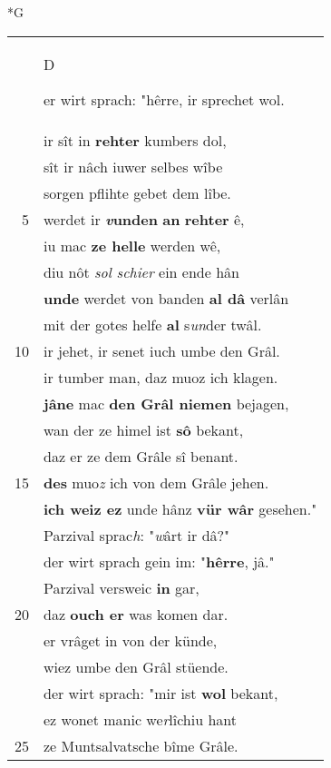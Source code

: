 \documentclass[8pt,a4paper,notitlepage]{article}
\begin{document}
\newpage
\begin{table}[ht]
\begin{minipage}[t]{0.5\linewidth}
\small
\begin{center}*G
\end{center}
\begin{tabular}{rl}
 & \begin{large}D\end{large}er wirt sprach: "hêrre, ir sprechet wol.\\ 
 & ir sît in \textbf{rehter} kumbers dol,\\ 
 & sît ir nâch iuwer selbes wîbe\\ 
 & sorgen pflihte gebet dem lîbe.\\ 
5 & werdet ir \textbf{\textit{v}unden} \textbf{an} \textbf{rehter} ê,\\ 
 & iu mac \textbf{ze helle} werden wê,\\ 
 & diu nôt \textit{sol schier} ein ende hân\\ 
 & \textbf{unde} werdet von banden \textbf{al dâ} verlân\\ 
 & mit der gotes helfe \textbf{al} s\textit{un}der twâl.\\ 
10 & ir jehet, ir senet iuch umbe den Grâl.\\ 
 & ir tumber man, daz muoz ich klagen.\\ 
 & \textbf{jâ}\textbf{ne} mac \textbf{den Grâl niemen} bejagen,\\ 
 & wan der ze himel ist \textbf{sô} bekant,\\ 
 & daz er ze dem Grâle sî benant.\\ 
15 & \textbf{des} muo\textit{z} ich von dem Grâle jehen.\\ 
 & \textbf{ich weiz ez} unde hânz \textbf{vür wâr} gesehen."\\ 
 & Parzival sprac\textit{h}: "\textit{w}ârt ir dâ?"\\ 
 & der wirt sprach gein im: "\textbf{hêrre}, jâ."\\ 
 & Parzival versweic \textbf{in} gar,\\ 
20 & daz \textbf{ouch er} was komen dar.\\ 
 & er vrâget in von der künde,\\ 
 & wiez umbe den Grâl stüende.\\ 
 & der wirt sprach: "mir ist \textbf{wol} bekant,\\ 
 & ez wonet manic we\textit{r}lîchiu hant\\ 
25 & ze Muntsalvatsche bîme Grâle.\\ 

\end{tabular}
\end{minipage}
\end{table}
\end{document}
